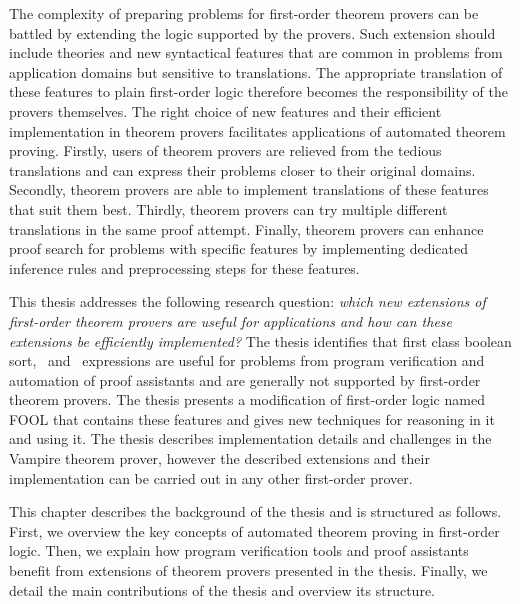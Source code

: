 The complexity of preparing problems for first-order theorem provers can be battled by extending the logic supported by the provers. Such extension should include theories and new syntactical features that are common in problems from application domains but sensitive to translations. The appropriate translation of these features to plain first-order logic therefore becomes the responsibility of the provers themselves. The right choice of new features and their efficient implementation in theorem provers facilitates applications of automated theorem proving. Firstly, users of theorem provers are relieved from the tedious translations and can express their problems closer to their original domains. Secondly, theorem provers are able to implement translations of these features that suit them best. Thirdly, theorem provers can try multiple different translations in the same proof attempt. Finally, theorem provers can enhance proof search for problems with specific features by implementing dedicated inference rules and preprocessing steps for these features.

This thesis addresses the following research question: \emph{which new extensions of first-order theorem provers are useful for applications and how can these extensions be efficiently implemented?} The thesis identifies that first class boolean sort, \ITE\ and \LETIN\ expressions are useful for problems from program verification and automation of proof assistants and are generally not supported by first-order theorem provers. The thesis presents a modification of first-order logic named FOOL that contains these features and gives new techniques for reasoning in it and using it. The thesis describes implementation details and challenges in the Vampire theorem prover, however the described extensions and their implementation can be carried out in any other first-order prover.

This chapter describes the background of the thesis and is structured as follows. First, we overview the key concepts of automated theorem proving in first-order logic. Then, we explain how program verification tools and proof assistants benefit from extensions of theorem provers presented in the thesis. Finally, we detail the main contributions of the thesis and overview its structure.


